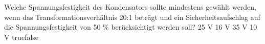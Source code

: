     {Welche Spannungsfestigkeit des Kondensators sollte mindestens gewählt werden, wenn das Transformationsverhältnis 20:1 beträgt und ein Sicherheitsaufschlag auf die Spannungsfestigkeit von 50 \% berücksichtigt werden soll?}
    {25 V }
    {16 V }
    {35 V}
    {10 V}
    {true}{false}